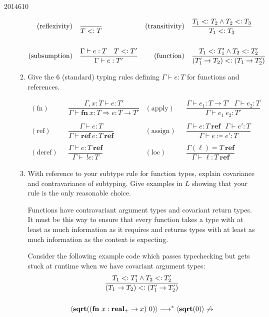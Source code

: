 \documentclass[10pt,\jkfside,a4paper]{article}
\begin{document}
\begin{examquestion}{2014}{6}{10}
\begin{enumerate}[label=(\alph*)]
\begin{enumerate}[label=(\roman*)]
\begin{align*}
(\text{reflexivity}) \ \ \  &
\dfrac{}{T <\vcentcolon T}
&
(\text{transitivity}) \ \ \ &
\dfrac{T_1 <\vcentcolon T_2 \wedge T_2 <\vcentcolon T_3}{T_1 <\vcentcolon T_3}
\\\\
(\text{subsumption})\ \ \ &
\dfrac{
\Gamma \vdash e: T \ \ \ T <\vcentcolon T'
}{
\Gamma \vdash e: T'
}
&
(\text{function}) \ \ \ &
\dfrac{
T_1 <\vcentcolon T_1' \wedge T_2 <\vcentcolon T_2'
}{
(T_1' \to T_2) <\vcentcolon (T_1 \to T_2')
}
\end{align*}

\item Give the 6 (standard) typing rules defining $\Gamma \vdash e: T$ for
functions and references.

\begin{align*}
(\text{fn}) \ \ \ &
\dfrac{
\Gamma, x:T \vdash e: T'
}{
\Gamma \vdash \mathbf{fn} \ x: T \Rightarrow e: T \to T'
}
&
(\text{apply}) \ \ \ &
\dfrac{
\Gamma \vdash e_1: T \to T' \ \ \ \Gamma \vdash e_2: T
}{
\Gamma \vdash e_1 \ e_2: T'
}\\\\
(\text{ref}) \ \ \ &
\dfrac{
\Gamma \vdash e: T
}{
\Gamma \vdash \mathbf{ref} \ e: T \ \mathbf{ref}
}
&
(\text{assign}) \ \ \ &
\dfrac{
\Gamma \vdash e: T \ \mathbf{ref} \ \ \ \Gamma \vdash e': T
}{
\Gamma \vdash e \coloneqq e': T
}\\\\
(\text{deref}) \ \ \ &
\dfrac{
\Gamma \vdash e: T \ \mathbf{ref}
}{
\Gamma \vdash \ !e: T
}
&
(\text{loc}) \ \ \ &
\dfrac{
\Gamma(\ell) = T \ \mathbf{ref}
}{
\Gamma \vdash \ell: T \ \mathbf{ref}
}
\end{align*}

\item With reference to your subtype rule for function types, explain
covariance and contravariance of subtyping. Give examples in $L$ showing that
your rule is the only reasonable choice.

Functions have contravariant argument types and covariant return types. It
must be this way to ensure that every function takes a type with at least as
much information as it requires and returns types with at least as much
information as the context is expecting.

Consider the following example code which passes typechecking but gets stuck
at runtime when we have covariant argument types:
\begin{gather*}
\dfrac{
T_1 <\vcentcolon T_1' \wedge T_2 <\vcentcolon T_2'
}{
(T_1 \to T_2) <\vcentcolon (T_1' \to T_2')
}\\\\
\langle \mathbf{sqrt}((\mathbf{fn} \ x: \mathbf{real}_+ \to x) \ 0) \rangle
\longrightarrow^* \langle \mathbf{sqrt}(0) \rangle \not\to
\end{gather*}


\end{enumerate}
\end{enumerate}
\end{examquestion}
\end{document}
